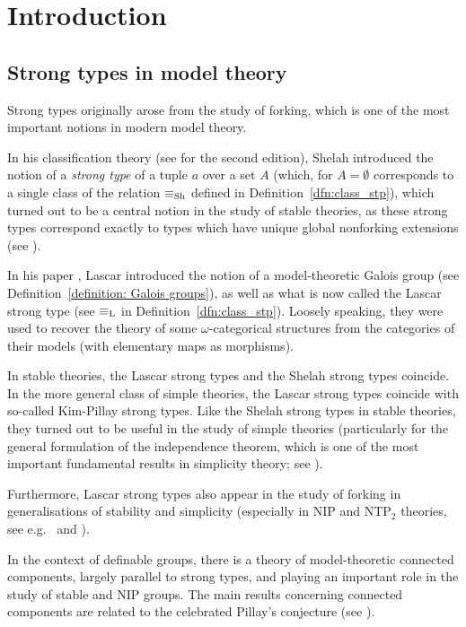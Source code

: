 
	\chapter{Introduction}
	
	\section{Strong types in model theory}
	Strong types originally arose from the study of forking, which is one of the most important notions in modern model theory.
	
	In his classification theory (see \cite{Sh90} for the second edition), Shelah introduced the notion of a \emph{strong type} of a tuple $a$ over a set $A$ (which, for $A=\emptyset$ corresponds to a single class of the relation $\equiv_{\mathrm{Sh}}$ defined in Definition~\ref{dfn:class_stp}), which turned out to be a central notion in the study of stable theories, as these strong types correspond exactly to types which have unique global nonforking extensions (see \cite[Corollary 2.9]{Sh90}).
	
	In his paper \cite{Las82}, Lascar introduced the notion of a model-theoretic Galois group (see Definition~\ref{definition: Galois groups}), as well as what is now called the Lascar strong type (see $\equiv_{\mathrm{L}}$ in Definition~\ref{dfn:class_stp}). Loosely speaking, they were used to recover the theory of some $\omega$-categorical structures from the categories of their models (with elementary maps as morphisms).
	
	In stable theories, the Lascar strong types and the Shelah strong types coincide. In the more general class of simple theories, the Lascar strong types coincide with so-called Kim-Pillay strong types. Like the Shelah strong types in stable theories, they turned out to be useful in the study of simple theories (particularly for the general formulation of the independence theorem, which is one of the most important fundamental results in simplicity theory; see \cite[Corollary 10.9]{Cas11}).
	
	Furthermore, Lascar strong types also appear in the study of forking in generalisations of stability and simplicity (especially in NIP and NTP$_2$ theories, see e.g.\ \cite{BC14} and \cite[Proposition 2.1]{HP11}).
	
	In the context of definable groups, there is a theory of model-theoretic connected components, largely parallel to strong types, and playing an important role in the study of stable and NIP groups. The main results concerning connected components are related to the celebrated Pillay's conjecture (see \cite{peterzil_survey}).
	
